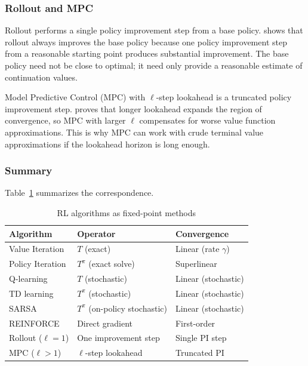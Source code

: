 \subsubsection{Rollout and MPC}

Rollout performs a single policy improvement step from a base policy. \citet{bertsekas2024} shows that rollout always improves the base policy because one policy improvement step from a reasonable starting point produces substantial improvement. The base policy need not be close to optimal; it need only provide a reasonable estimate of continuation values.

Model Predictive Control (MPC) with $\ell$-step lookahead is a truncated policy improvement step. \citet{bertsekas2024} proves that longer lookahead expands the region of convergence, so MPC with larger $\ell$ compensates for worse value function approximations. This is why MPC can work with crude terminal value approximations if the lookahead horizon is long enough.

\subsubsection{Summary}

Table~\ref{tab:operator_correspondence} summarizes the correspondence.

\begin{table}[h!]
\centering
\caption{RL algorithms as fixed-point methods \citep{bertsekas2024}}
\label{tab:operator_correspondence}
\begin{tabular}{lll}
\hline
Algorithm & Operator & Convergence \\
\hline
Value Iteration & $T$ (exact) & Linear (rate $\gamma$) \\
Policy Iteration & $T^\pi$ (exact solve) & Superlinear \\
Q-learning & $T$ (stochastic) & Linear (stochastic) \\
TD learning & $T^\pi$ (stochastic) & Linear (stochastic) \\
SARSA & $T^\pi$ (on-policy stochastic) & Linear (stochastic) \\
REINFORCE & Direct gradient & First-order \\
Rollout ($\ell=1$) & One improvement step & Single PI step \\
MPC ($\ell > 1$) & $\ell$-step lookahead & Truncated PI \\
\hline
\end{tabular}
\end{table}

